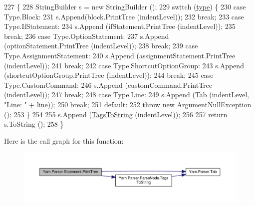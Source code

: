 \begin{DoxyCode}
227             \{
228                 StringBuilder s = \textcolor{keyword}{new} StringBuilder ();
229                 \textcolor{keywordflow}{switch} (\hyperlink{a00156_aa3fa0eb260e412720562ce06b7dc06fe}{type}) \{
230                 \textcolor{keywordflow}{case} Type.Block:
231                     s.Append(block.PrintTree (indentLevel));
232                     \textcolor{keywordflow}{break};
233                 \textcolor{keywordflow}{case} Type.IfStatement:
234                     s.Append (ifStatement.PrintTree (indentLevel));
235                     \textcolor{keywordflow}{break};
236                 \textcolor{keywordflow}{case} Type.OptionStatement:
237                     s.Append (optionStatement.PrintTree (indentLevel));
238                     \textcolor{keywordflow}{break};
239                 \textcolor{keywordflow}{case} Type.AssignmentStatement:
240                     s.Append (assignmentStatement.PrintTree (indentLevel));
241                     \textcolor{keywordflow}{break};
242                 \textcolor{keywordflow}{case} Type.ShortcutOptionGroup:
243                     s.Append (shortcutOptionGroup.PrintTree (indentLevel));
244                     \textcolor{keywordflow}{break};
245                 \textcolor{keywordflow}{case} Type.CustomCommand:
246                     s.Append (customCommand.PrintTree (indentLevel));
247                     \textcolor{keywordflow}{break};
248                 \textcolor{keywordflow}{case} Type.Line:
249                     s.Append (\hyperlink{a00139_aa8fa36b46de12a1c561d77b99c4b9ae3}{Tab} (indentLevel, \textcolor{stringliteral}{"Line: "} + \hyperlink{a00156_a37695c7b00776bb292fd64894a70fb72}{line}));
250                     \textcolor{keywordflow}{break};
251                 \textcolor{keywordflow}{default}:
252                     \textcolor{keywordflow}{throw} \textcolor{keyword}{new} ArgumentNullException ();
253                 \}
254 
255                 s.Append (\hyperlink{a00138_a054f36c80d5eeacd569a8859f599af67}{TagsToString} (indentLevel));
256 
257                 \textcolor{keywordflow}{return} s.ToString ();
258             \}
\end{DoxyCode}


Here is the call graph for this function\-:
\nopagebreak
\begin{figure}[H]
\begin{center}
\leavevmode
\includegraphics[width=350pt]{a00156_aaac6d1e0c3b31f33e1c6f964c205153e_cgraph}
\end{center}
\end{figure}



